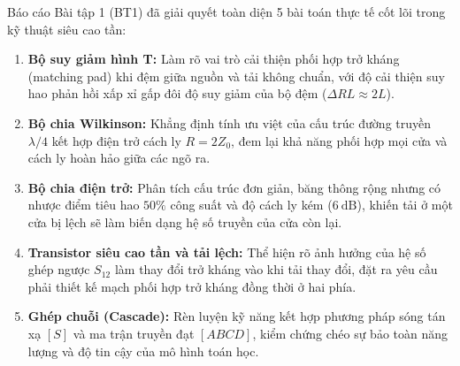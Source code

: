 \documentclass[12pt,a4paper]{article}
\begin{document}
Báo cáo Bài tập 1 (BT1) đã giải quyết toàn diện 5 bài toán thực tế cốt lõi trong kỹ thuật siêu cao tần:
\begin{enumerate}
    \item \textbf{Bộ suy giảm hình T:} Làm rõ vai trò cải thiện phối hợp trở kháng (matching pad) khi đệm giữa nguồn và tải không chuẩn, với độ cải thiện suy hao phản hồi xấp xỉ gấp đôi độ suy giảm của bộ đệm ($\Delta RL \approx 2L$).
    \item \textbf{Bộ chia Wilkinson:} Khẳng định tính ưu việt của cấu trúc đường truyền $\lambda/4$ kết hợp điện trở cách ly $R = 2Z_0$, đem lại khả năng phối hợp mọi cửa và cách ly hoàn hảo giữa các ngõ ra.
    \item \textbf{Bộ chia điện trở:} Phân tích cấu trúc đơn giản, băng thông rộng nhưng có nhược điểm tiêu hao $50\%$ công suất và độ cách ly kém ($6~\text{dB}$), khiến tải ở một cửa bị lệch sẽ làm biến dạng hệ số truyền của cửa còn lại.
    \item \textbf{Transistor siêu cao tần và tải lệch:} Thể hiện rõ ảnh hưởng của hệ số ghép ngược $S_{12}$ làm thay đổi trở kháng vào khi tải thay đổi, đặt ra yêu cầu phải thiết kế mạch phối hợp trở kháng đồng thời ở hai phía.
    \item \textbf{Ghép chuỗi (Cascade):} Rèn luyện kỹ năng kết hợp phương pháp sóng tán xạ $[S]$ và ma trận truyền đạt $[ABCD]$, kiểm chứng chéo sự bảo toàn năng lượng và độ tin cậy của mô hình toán học.
\end{enumerate}
\end{document}
